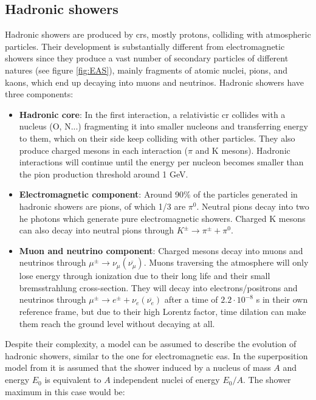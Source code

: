 \documentclass[main.tex]{subfiles}
\begin{document}
\subsection{Hadronic showers}

Hadronic showers are produced by \glspl{cr}, mostly protons, colliding with atmospheric particles. Their development is substantially different from electromagnetic showers since they produce a vast number of secondary particles of different natures (see figure \ref{fig:EAS}), mainly fragments of atomic nuclei, pions, and kaons, which end up decaying into muons and neutrinos. Hadronic showers have three components:\\

\begin{itemize}
\item \textbf{Hadronic core}: In the first interaction, a relativistic \gls{cr} collides with a nucleus (O, N...) fragmenting it into smaller nucleons and transferring energy to them, which on their side keep colliding with other particles. They also produce charged mesons in each interaction ($\pi$ and K mesons). Hadronic interactions will continue until the energy per nucleon becomes smaller than the pion production threshold around 1 GeV.

\item \textbf{Electromagnetic component}: Around 90\% of the particles generated in hadronic showers are pions, of which 1/3 are $\pi^{0}$. Neutral pions decay into two \gls{he} photons which generate pure electromagnetic showers. Charged K mesons can also decay into neutral pions through $K^\pm \longrightarrow \pi^{\pm} + \pi^0$.

\item \textbf{Muon and neutrino component}: Charged mesons decay into muons and neutrinos through $\mu^{\pm} \longrightarrow \nu_{\mu}(\overline{\nu_{\mu}})$. Muons traversing the atmosphere will only lose energy through ionization due to their long life and their small bremsstrahlung cross-section. They will decay into electrons/positrons and neutrinos through $\mu^{\pm} \longrightarrow e^{\pm} + \nu_{e}(\overline{\nu_{e}})$ after a time of $2.2 \cdot 10^{-8}$ s in their own reference frame, but due to their high Lorentz factor, time dilation can make them reach the ground level without decaying at all.\\
\end{itemize}

Despite their complexity, a model can be assumed to describe the evolution of hadronic showers, similar to the one for electromagnetic \gls{eas}. In the superposition model from \cite{2016GaisserCRandParticlePhy} it is assumed that the shower induced by a nucleus of mass $A$ and energy $E_0$ is equivalent to $A$ independent nuclei of energy $E_0/A$. The shower maximum in this case would be:
\end{document}
